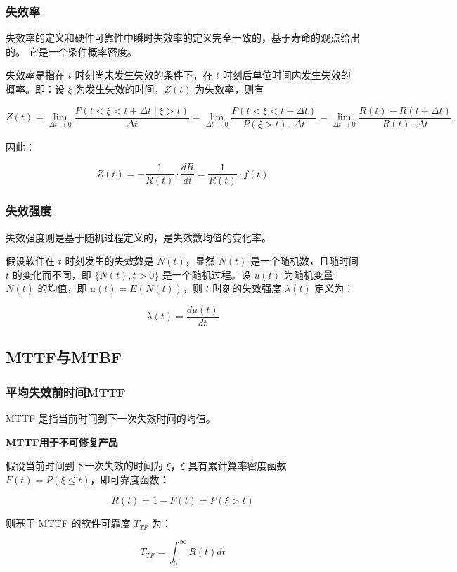 \subsubsection{失效率}

失效率的定义和硬件可靠性中瞬时失效率的定义完全一致的，基于寿命的观点给出的。
它是一个条件概率密度。

失效率是指在 $t$ 时刻尚未发生失效的条件下，在 $t$ 时刻后单位时间内发生失效的概率。即：设 $\xi$ 为发生失效的时间，$Z(t)$ 为失效率，则有

\[
Z(t) = \lim_{\Delta t \to 0} \frac{P(t < \xi < t + \Delta t \mid \xi > t)}{\Delta t}
= \lim_{\Delta t \to 0} \frac{P(t < \xi < t + \Delta t)}{P(\xi > t) \cdot \Delta t}
= \lim_{\Delta t \to 0} \frac{R(t) - R(t + \Delta t)}{R(t) \cdot \Delta t}
\]

因此：

\[
Z(t) = -\frac{1}{R(t)} \cdot \frac{dR}{dt} = \frac{1}{R(t)} \cdot f(t)
\]


\subsubsection{失效强度}

失效强度则是基于随机过程定义的，是失效数均值的变化率。

假设软件在 $t$ 时刻发生的失效数是 $N(t)$，显然 $N(t)$ 是一个随机数，且随时间 $t$ 的变化而不同，即 $\{N(t), t > 0\}$ 是一个随机过程。设 $u(t)$ 为随机变量 $N(t)$ 的均值，即 $u(t) = E(N(t))$，则 $t$ 时刻的失效强度 $\lambda(t)$ 定义为：

\[
\lambda(t) = \frac{du(t)}{dt}
\]

\subsection{MTTF与MTBF}

\subsubsection{平均失效前时间MTTF}

MTTF 是指当前时间到下一次失效时间的均值。

\textbf{MTTF用于不可修复产品}

假设当前时间到下一次失效的时间为 $\xi$，$\xi$ 具有累计算率密度函数 $F(t) = P(\xi \leq t)$，即可靠度函数：

\[
R(t) = 1 - F(t) = P(\xi > t)
\]

则基于 MTTF 的软件可靠度 $T_{TF}$ 为：

\[
T_{TF} = \int_0^{\infty} R(t) dt
\]


